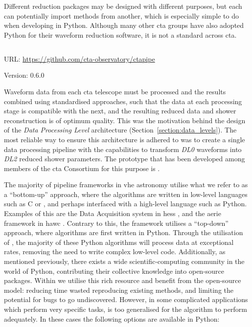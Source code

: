 Different reduction packages may be designed with different purposes, but each can potentially import methods from another, which is especially simple to do when developing in Python. Although many other \gls{cta} groups have also adopted Python for their waveform reduction software, it is not a standard across \gls{cta}.

\subsection{}
\vspace{-0.7em}
\noindent \hspace{\parindent} {\tiny URL: \url{https://github.com/cta-observatory/ctapipe} \par}
\noindent \hspace{\parindent} {\tiny Version: 0.6.0 \par}

\noindent Waveform data from each \gls{cta} telescope must be processed and the results combined using standardised approaches, such that the data at each processing stage is compatible with the next, and the resulting reduced data and shower reconstruction is of optimum quality. This was the motivation behind the design of the \textit{Data Processing Level} architecture (Section~\ref{section:data_levels}). The most reliable way to ensure this architecture is adhered to was to create a single data processing pipeline with the capabilities to transform \textit{DL0} waveforms into \textit{DL2} reduced shower parameters. The prototype that has been developed among members of the \gls{cta} Consortium for this purpose is .

The majority of pipeline frameworks in \gls{vhe} astronomy utilise what we refer to as a ``bottom-up'' approach, where the algorithms are written in low-level languages such as C or \cpp, and perhaps interfaced with a high-level language such as Python. Examples of this are the Data Acquisition system in \gls{hess} \cite{Balzer2014}, and the \gls{aerie} framework in \gls{hawc} \cite{Abeysekara2018}. Contrary to this, the  framework utilises a ``top-down'' approach, where algorithms are first written in Python. Through the utilisation of , the majority of these Python algorithms will process data at exceptional rates, removing the need to write complex low-level code. Additionally, as mentioned previously, there exists a wide scientific-computing community in the world of Python, contributing their collective knowledge into open-source packages. Within  we utilise this rich resource and benefit from the open-source model: reducing time wasted reproducing existing methods, and limiting the potential for bugs to go undiscovered. However, in some complicated applications which perform very specific tasks,  is too generalised for the algorithm to perform adequately. In these cases the following options are available in Python:

